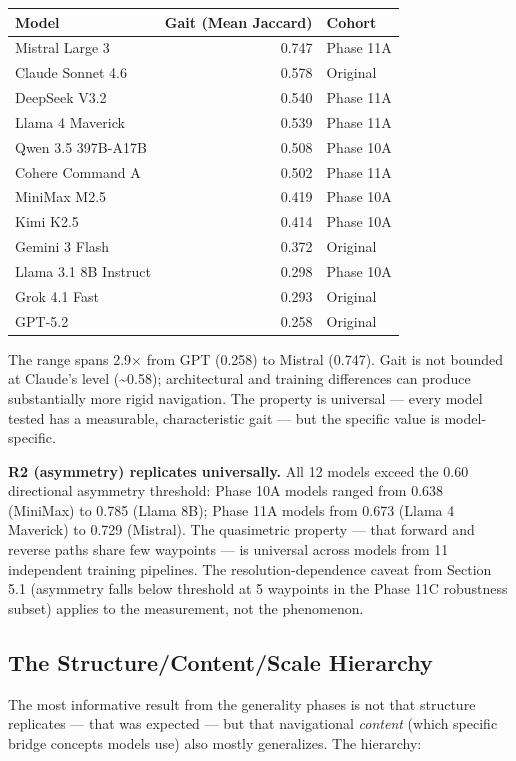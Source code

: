 \begin{longtable}[]{@{}lrl@{}}
\toprule\noalign{}
Model & Gait (Mean Jaccard) & Cohort \\
\midrule\noalign{}
\endhead
\bottomrule\noalign{}
\endlastfoot
Mistral Large 3 & 0.747 & Phase 11A \\
Claude Sonnet 4.6 & 0.578 & Original \\
DeepSeek V3.2 & 0.540 & Phase 11A \\
Llama 4 Maverick & 0.539 & Phase 11A \\
Qwen 3.5 397B-A17B & 0.508 & Phase 10A \\
Cohere Command A & 0.502 & Phase 11A \\
MiniMax M2.5 & 0.419 & Phase 10A \\
Kimi K2.5 & 0.414 & Phase 10A \\
Gemini 3 Flash & 0.372 & Original \\
Llama 3.1 8B Instruct & 0.298 & Phase 10A \\
Grok 4.1 Fast & 0.293 & Original \\
GPT-5.2 & 0.258 & Original \\
\end{longtable}

The range spans 2.9× from GPT (0.258) to Mistral (0.747). Gait is not bounded at Claude's level (\textasciitilde0.58); architectural and training differences can produce substantially more rigid navigation. The property is universal --- every model tested has a measurable, characteristic gait --- but the specific value is model-specific.

\textbf{R2 (asymmetry) replicates universally.} All 12 models exceed the 0.60 directional asymmetry threshold: Phase 10A models ranged from 0.638 (MiniMax) to 0.785 (Llama 8B); Phase 11A models from 0.673 (Llama 4 Maverick) to 0.729 (Mistral). The quasimetric property --- that forward and reverse paths share few waypoints --- is universal across models from 11 independent training pipelines. The resolution-dependence caveat from Section 5.1 (asymmetry falls below threshold at 5 waypoints in the Phase 11C robustness subset) applies to the measurement, not the phenomenon.

\subsection{The Structure/Content/Scale Hierarchy}\label{the-structurecontentscale-hierarchy}

The most informative result from the generality phases is not that structure replicates --- that was expected --- but that navigational \emph{content} (which specific bridge concepts models use) also mostly generalizes. The hierarchy:

